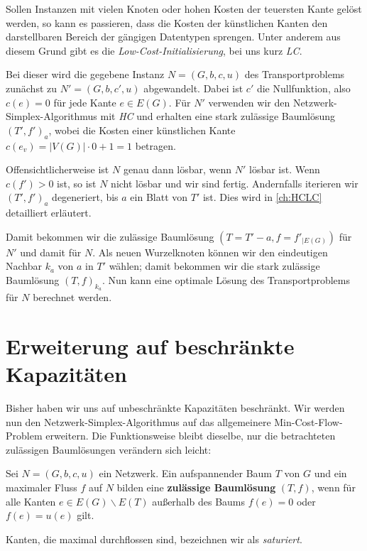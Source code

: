Sollen Instanzen mit vielen Knoten oder hohen Kosten der teuersten Kante gelöst werden, so kann es passieren, dass die Kosten der künstlichen Kanten den darstellbaren Bereich der gängigen Datentypen sprengen. Unter anderem aus diesem Grund gibt es die \emph{Low-Cost-Initialisierung}, bei uns kurz \emph{LC}.

Bei dieser wird die gegebene Instanz $N=(G,b,c,u)$ des Transportproblems zunächst zu $N'=(G,b,c',u)$ abgewandelt. Dabei ist $c'$ die Nullfunktion, also $c(e)=0$ für jede Kante $e\in E(G)$. Für $N'$ verwenden wir den Netzwerk-Simplex-Algorithmus mit \emph{HC} und erhalten eine stark zulässige Baumlösung $(T',f')_a$, wobei die Kosten einer künstlichen Kante $c(e_v)=|V(G)|\cdot0+1=1$ betragen.

Offensichtlicherweise ist $N$ genau dann lösbar, wenn $N'$ lösbar ist. Wenn $c(f')>0$ ist, so ist $N$ nicht lösbar und wir sind fertig. Andernfalls iterieren wir $(T',f')_a$ degeneriert, bis $a$ ein Blatt von $T'$ ist. Dies wird in \cref{ch:HCLC} detailliert erläutert.

Damit bekommen wir die zulässige Baumlösung $(T=T'-a, f=f'_{|E(G)})$ für $N'$ und damit für $N$. Als neuen Wurzelknoten können wir den eindeutigen Nachbar $k_a$ von $a$ in $T'$ wählen; damit bekommen wir die stark zulässige Baumlösung $(T,f)_{k_a}$. Nun kann eine optimale Lösung des Transportproblems für $N$ berechnet werden.

\section{Erweiterung auf beschränkte Kapazitäten}\label{ch:alg2}
Bisher haben wir uns auf unbeschränkte Kapazitäten beschränkt. Wir werden nun den Netzwerk-Simplex-Algorithmus auf das allgemeinere Min-Cost-Flow-Problem erweitern. Die Funktionsweise bleibt dieselbe, nur die betrachteten zulässigen Baumlösungen verändern sich leicht:

\begin{defn}Sei $N=(G,b,c,u)$ ein Netzwerk. Ein aufspannender Baum $T$ von $G$ und ein maximaler Fluss $f$ auf $N$ bilden eine \textbf{zulässige Baumlösung} $(T,f)$, wenn für alle Kanten $e\in E(G)\backslash E(T)$ außerhalb des Baums $f(e) = 0$ oder $f(e)=u(e)$ gilt.\end{defn}
\begin{anm}Kanten, die maximal durchflossen sind, bezeichnen wir als \emph{saturiert}.\end{anm}

